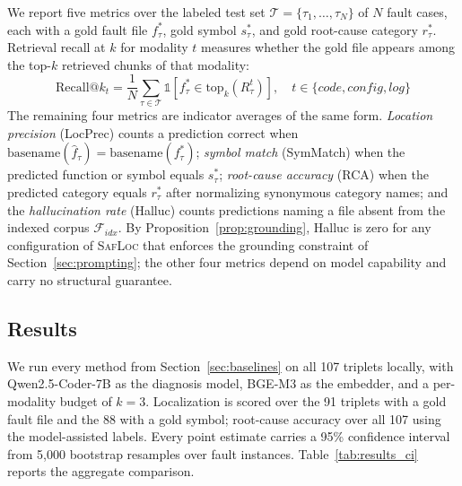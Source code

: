 \documentclass[runningheads]{llncs}
\begin{document}
We report five metrics over the labeled test set $\mathcal{T} = \{\tau_1, \dots, \tau_N\}$ of $N$ fault cases, each with a gold fault file $f_\tau^*$, gold symbol $s_\tau^*$, and gold root-cause category $r_\tau^*$. Retrieval recall at $k$ for modality $t$ measures whether the gold file appears among the top-$k$ retrieved chunks of that modality:
\begin{equation}
  \text{Recall@}k_t = \frac{1}{N} \sum_{\tau \in \mathcal{T}} \mathbb{1}\!\left[f_\tau^* \in \text{top}_k(R_\tau^t)\right], \quad t \in \{code, config, log\}
  \label{eq:recall}
\end{equation}
The remaining four metrics are indicator averages of the same form. \emph{Location precision} (LocPrec) counts a prediction correct when $\text{basename}(\hat f_\tau) = \text{basename}(f_\tau^*)$; \emph{symbol match} (SymMatch) when the predicted function or symbol equals $s_\tau^*$; \emph{root-cause accuracy} (RCA) when the predicted category equals $r_\tau^*$ after normalizing synonymous category names; and the \emph{hallucination rate} (Halluc) counts predictions naming a file absent from the indexed corpus $\mathcal{F}_{idx}$. By Proposition~\ref{prop:grounding}, Halluc is zero for any configuration of \textsc{SafLoc} that enforces the grounding constraint of Section~\ref{sec:prompting}; the other four metrics depend on model capability and carry no structural guarantee.

\subsection{Results}
\label{sec:results}

We run every method from Section~\ref{sec:baselines} on all 107 triplets locally, with Qwen2.5-Coder-7B as the diagnosis model, BGE-M3 as the embedder, and a per-modality budget of $k=3$. Localization is scored over the 91 triplets with a gold fault file and the 88 with a gold symbol; root-cause accuracy over all 107 using the model-assisted labels. Every point estimate carries a 95\% confidence interval from 5{,}000 bootstrap resamples over fault instances. Table~\ref{tab:results_ci} reports the aggregate comparison.
\end{document}
